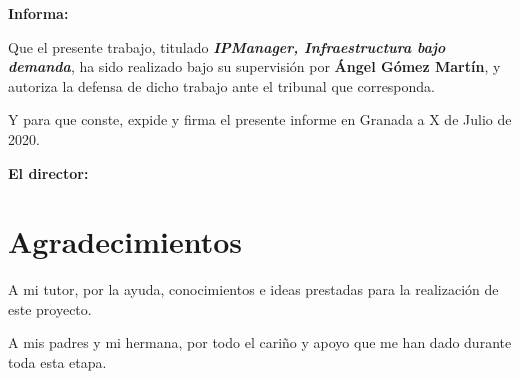 \vspace{0.5cm}

\textbf{Informa:}

\vspace{0.5cm}

Que el presente trabajo, titulado \textit{\textbf{IPManager, Infraestructura bajo demanda}},
ha sido realizado bajo su supervisión por \textbf{Ángel Gómez Martín}, y autoriza la defensa de dicho trabajo ante el tribunal que corresponda.

\vspace{0.5cm}

Y para que conste, expide y firma el presente informe en Granada a X de Julio de 2020.

\vspace{1cm}

\textbf{El director:}

\vspace{5cm}









\chapter*{Agradecimientos}
\thispagestyle{empty}
\vspace{1cm}

A mi tutor, por la ayuda, conocimientos e ideas prestadas para la realización de este proyecto.

\bigskip
A mis padres y mi hermana, por todo el cariño y apoyo que me han dado durante toda esta etapa.

